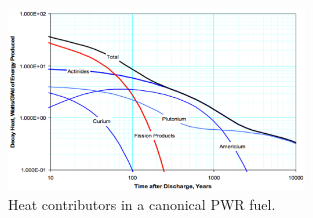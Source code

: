 \begin{figure}[htbp!]
  \begin{center}
    \includegraphics[width=0.7\textwidth]{wigeland_heat.eps}
  \end{center}
  \caption{Heat contributors in a canonical PWR 
    fuel\cite{wigeland_relationship_2010}.}
  \label{fig:<++>}
\end{figure}

